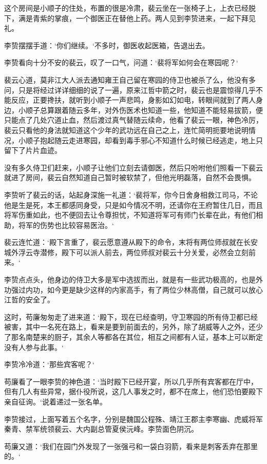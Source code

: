 这个房间是小顺子的住处，布置的很是冷肃，裴云坐在一张椅子上，上衣已经脱下，满是青紫的掌痕，一个御医正在替他上药。两人见到李贽进来，一起下拜见礼。

李贽摆摆手道：‘你们继续。‘不多时，御医收起医箱，告退出去。

李贽看向十分不安的裴云，叹了一口气，问道：‘裴将军如何会在寒园呢？‘

裴云心道，莫非江大人派去通知雍王自己留在寒园的侍卫也被杀了么，他没有多问，只是将经过详详细细的说了一遍，原来江哲中箭之时，裴云也是震惊得几乎不能反应，正要搀扶，就听到小顺子一声悲鸣，身影如幻如电，转眼间就到了两人身边，小顺子总算跟着随云多年，对外伤医术也知道一些，他知道不能轻易拔箭，便只能点了几处穴道止血，然后渡过真气替随云续命，他看了裴云一眼，神色冷厉，裴云只看他的身法就知道这个少年的武功远在自己之上，连忙简明扼要地说明情况，小顺子抱起随云走进寒园，却看到毒手邪心不知道什么时候已经逃走，地上只留下了片片血迹。

没有多久侍卫们赶来，小顺子让他们立刻去请御医，然后只吩咐他们照看一下裴云就进了房间，裴云自然知道自己暂时被软禁了，但他光明磊落，自然不会畏惧。

李贽听了裴云的话，站起身深施一礼道：‘裴将军，你今日舍身相救江司马，不论他是生是死，本王都感同身受，只是如今情况不明，还请你在王府暂住几日，而且将军伤重如此，也不便回去让令尊担忧，不知道将军可有师门长辈在此，有他们相助，将军的伤势也比较容易医治。‘

裴云连忙道：‘殿下言重了，裴云愿意遵从殿下的命令，末将有两位师叔就在长安城外浮云寺潜修，殿下可以派人前去，两位师叔对裴云十分关爱，必然会立刻前来。‘

李贽点点头，他身边的侍卫大多是军中选拔而出，就是有一些武功极高的，也是外功强过内功，如今更是缺少这样的内家高手，有了两位少林高僧，自己就可以放心江哲的安全了。

这时，苟廉匆匆走了进来道：‘殿下，现在已经查明，守卫寒园的所有侍卫都已经被害，其中一名死在路上，看来是要到前面去的，另外，除了胡威等人之外，还少了那名南楚来的厨子，其余人等都各在其位，相互之间都有人证，基本上可以断定没有人参与此事。‘

李贽冷冷道：‘那些宾客呢？‘

苟廉看了一眼李贽的神色道：‘当时殿下已经开宴，所以几乎所有宾客都在厅中，但有几人有些异常，据仆役所说，这几人事发之时，都不在席上，他们恐怕要殿下亲自征询。‘说着递过一张名单。

李贽接过，上面写着五个名字，分别是魏国公程殊、靖江王郡主李寒幽、虎威将军秦青、禁军统领裴云、大内副总管夏侯沅峰。李贽面色阴沉。

苟廉又道：‘我们在园门外发现了一张强弓和一袋白羽箭，看来是刺客丢弃在那里的。‘

